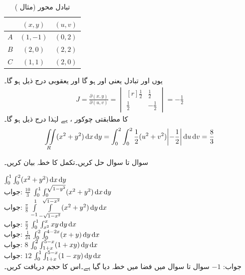 %
\begin{table}
\caption{تبادل محور (مثال )}
\label{جدول_مثال_خطی_تکمل_دوہرا_ب}
\centering
\begin{tabular}{c c c}
& $(x,y)$& $(u,v)$\\
\hline
$A$&$(1,-1)$&$(0,2)$\\
$B$&$(2,0)$&$(2,2)$\\
$C$&$(1,1)$&$(2,0)$
\end{tabular}
\end{table}

یوں   اور  تبادل یعنی   اور   ہو گا اور یعقوبی درج ذیل ہو گا۔
\begin{align*}
J=\frac{\partial (x,y)}{\partial (u,v)}=
\begin{vmatrix*}[r]
\frac{1}{2}&\frac{1}{2}\\[0.5em]
\frac{1}{2}&-\frac{1}{2}
\end{vmatrix*}=-\frac{1}{2}
\end{align*}
 کا مطابقتی چوکور ،  ہے لہٰذا درج ذیل ہو گا۔
\begin{align*}
\iint\limits_R (x^2+y^2)\dif x\dif y=\int_0^2\int_0^2 \frac{1}{2}(u^2+v^2)\abs{-\frac{1}{2}}\dif u\dif v=\frac{8}{3}
\end{align*}

سوال  تا سوال  حل کریں۔تکمل کا خطہ بیان کریں۔

\quad
$\int_0^1\int_0^2 (x^2+y^2)\dif x\dif y$\\
جواب:\quad
$\tfrac{10}{3}$
\quad
$\int_0^1\int_0^{\sqrt{1-y^2}} (x^2+y^2)\dif x\dif y$\\
جواب:\quad
$\tfrac{\pi}{8}$
\quad
$\int\limits_{-1}^1\int\limits_{-\sqrt{1-x^2}}^{\sqrt{1-x^2}} (x^2+y^2)\dif y\dif x$\\
جواب:\quad
$\tfrac{\pi}{2}$
\quad
$\int_{0}^1\int_{x^2}^{x} xy\dif y\dif x$\\
جواب:\quad
$\tfrac{1}{24}$
\quad
$\int_{0}^2\int_{0}^{4-2x} (x+y)\dif y\dif x$\\
جواب:\quad
$8$
\quad
$\int_{0}^2\int_{1+x}^{5-x} (1+xy)\dif y\dif x$\\
جواب:\quad
$12$
\quad
$\int_{0}^1\int_{1+x}^{5-x} (1-xy)\dif y\dif x$\\
جواب:\quad
$-1$
سوال  تا سوال  میں فضا میں خطہ دیا گیا ہے۔اس کا حجم دریافت کریں۔

